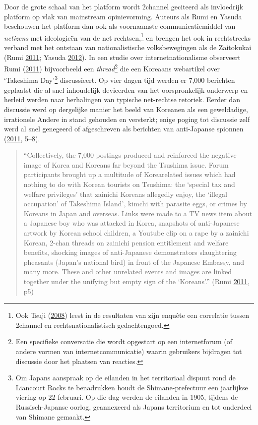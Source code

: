 \documentclass[10.5pt,dutch,]{article}
\begin{document}
Door de grote schaal van het platform wordt 2channel geciteerd als
invloedrijk platform op vlak van mainstream opinievorming. Auteurs als
Rumi en Yasuda beschouwen het platform dan ook als voornaamste
communicatiemiddel van \emph{netizens} met ideologieën van de net
rechtsen,\footnote{Ook Tsuji
  (\protect\hyperlink{ref-tsujiux5fintanettoux5f2008}{2008}) leest in de
  resultaten van zijn enquête een correlatie tussen 2channel en
  rechtsnationalistisch gedachtengoed.} en brengen het ook in
rechtstreeks verband met het ontstaan van nationalistische
volksbewegingen als de Zaitokukai (Rumi
\protect\hyperlink{ref-rumiux5fkoreansux5f2011}{2011}; Yasuda
\protect\hyperlink{ref-yasudaux5fnettoux5f2012}{2012}). In een studie
over internetnationalisme observeert Rumi
(\protect\hyperlink{ref-rumiux5fkoreansux5f2011}{2011}) bijvoorbeeld een
\emph{thread}\footnote{Een specifieke conversatie die wordt opgestart op
  een internetforum (of andere vormen van internetcommunicatie) waarin
  gebruikers bijdragen tot discussie door het plaatsen van reacties.}
die een Koreaans webartikel over `Takeshima Day'\footnote{Om Japans
  aanspraak op de eilanden in het territoriaal dispuut rond de Liancourt
  Rocks te benadrukken houdt de Shimane-prefectuur een jaarlijkse
  viering op 22 februari. Op die dag werden de eilanden in 1905, tijdens
  de Russisch-Japanse oorlog, geannexeerd als Japans territorium en tot
  onderdeel van Shimane gemaakt.} discussieert. Op vier dagen tijd
werden er 7,000 berichten geplaatst die al snel inhoudelijk devieerden
van het oorspronkelijk onderwerp en herleid werden naar herhalingen van
typische net-rechtse retoriek. Eerder dan discussie werd op dergelijke
manier het beeld van Koreanen als een geweldadige, irrationele Andere in
stand gehouden en versterkt; enige poging tot discussie zelf werd al
snel genegeerd of afgeschreven als berichten van anti-Japanse spionnen
(\protect\hyperlink{ref-rumiux5fkoreansux5f2011}{2011}, 5--8).

\begin{quote}
``Collectively, the 7,000 postings produced and reinforced the negative
image of Korea and Koreans far beyond the Tsushima issue. Forum
participants brought up a multitude of Korearelated issues which had
nothing to do with Korean tourists on Tsushima: the `special tax and
welfare privileges' that zainichi Koreans allegedly enjoy, the `illegal
occupation' of Takeshima Island', kimchi with parasite eggs, or crimes
by Koreans in Japan and overseas. Links were made to a TV news item
about a Japanese boy who was attacked in Korea, snapshots of
anti-Japanese artwork by Korean school children, a Youtube clip on a
rape by a zainichi Korean, 2-chan threads on zainichi pension
entitlement and welfare benefits, shocking images of anti-Japanese
demonstrators slaughtering pheasants (Japan's national bird) in front of
the Japanese Embassy, and many more. These and other unrelated events
and images are linked together under the unifying but empty sign of the
`Koreans'.'' (Rumi
\protect\hyperlink{ref-rumiux5fkoreansux5f2011}{2011}, p5)
\end{quote}
\end{document}
